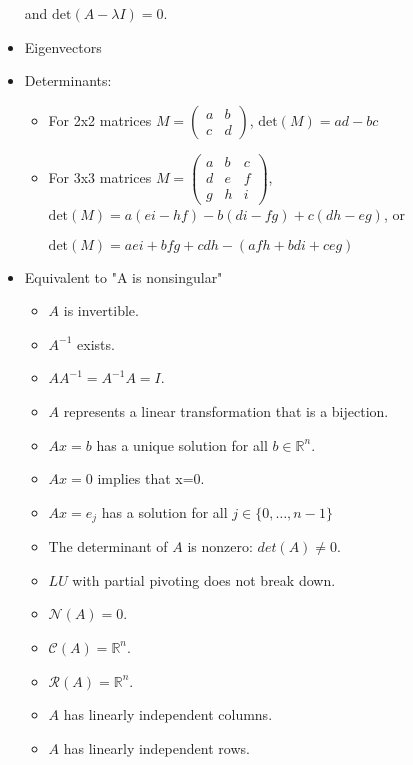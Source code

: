 \documentclass[a4paper]{article}
\begin{document}
\begin{itemize}
            and \( \text{det}(A-\lambda I)=0\).
        \item Eigenvectors
        \item Determinants:
        	\begin{itemize}
        		\item For 2x2 matrices 
                	\(M =
                    \begin{pmatrix}
                		a & b \\
                        c & d
                	\end{pmatrix}\),
                    \(\text{det}(M)=ad-bc \)
                \item For 3x3 matrices 
                	\(M =
                    \begin{pmatrix}
                		a & b & c \\
                        d & e & f \\
                        g & h & i
                	\end{pmatrix}\),
                    \(\text{det}(M)= a(ei-hf)-b(di-fg)+c(dh-eg) \), or
                    
                    \(\text{det}(M)= aei+bfg+cdh-(afh+bdi+ceg) \)
        	\end{itemize}
        \item Equivalent to "A is nonsingular"
        	\begin{itemize}
        		\item \(A\) is invertible.
                \item \(A^{-1}\) exists.
                \item \(AA^{-1}=A^{-1}A=I\).
                \item \(A\) represents a linear transformation that is a bijection.
                \item \(Ax=b\) has a unique solution for all \(b\in \mathbb{R} ^n\).
                \item \(Ax=0\) implies that x=0.
                \item \(Ax=e_j\) has a solution for all \(j\in \{0,\dots ,n-1\}\)
                \item The determinant of \(A\) is nonzero: \(det(A)\neq 0\).
                \item \(LU\) with partial pivoting does not break down.
                \item \(\mathcal{N}(A)={0}\).
                \item \(\mathcal{C}(A)=\mathbb{R}^n\).
                \item \(\mathcal{R}(A)=\mathbb{R}^n\).
                \item \(A\) has linearly independent columns.
                \item \(A\) has linearly independent rows.
        	\end{itemize}
	\end{itemize}
\end{document}
